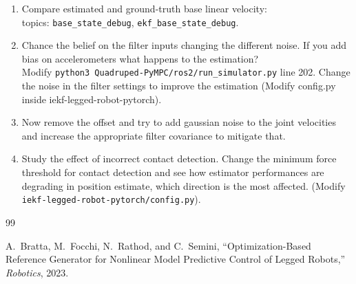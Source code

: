 \documentclass[11pt,a4paper]{article}
\begin{document}
\begin{enumerate}[label=\arabic*.]
    \item Compare estimated and ground-truth base linear velocity: \\ topics: \verb|base_state_debug|, \verb|ekf_base_state_debug|.
    \item Chance the belief on the filter inputs changing the different noise. If you add bias on accelerometers what happens to the estimation? \\Modify \verb|python3 Quadruped-PyMPC/ros2/run_simulator.py|  line 202.
    Change the noise in the filter settings to improve the estimation (Modify config.py inside iekf-legged-robot-pytorch). 
    \item Now remove the offset and try to add gaussian noise to the joint velocities and increase the appropriate filter covariance to mitigate that. 
    \item   Study the effect of incorrect contact detection. Change the minimum force threshold for contact detection and see how estimator performances are degrading in position estimate, which direction is the most affected. (Modify \verb|iekf-legged-robot-pytorch/config.py|). 
\end{enumerate}


\begin{thebibliography}{99}
	
	A.~Bratta, M.~Focchi, N.~Rathod, and C.~Semini,
	``Optimization-Based Reference Generator for Nonlinear Model Predictive Control of Legged Robots,''
	\emph{Robotics}, 2023.
	
\end{thebibliography}
\end{document}
